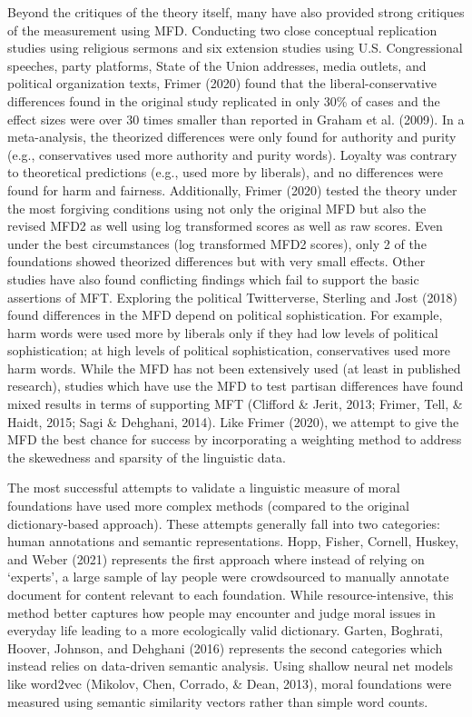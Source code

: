 \documentclass[
  man,floatsintext]{apa6}
\begin{document}
Beyond the critiques of the theory itself, many have also provided strong critiques of the measurement using MFD. Conducting two close conceptual replication studies using religious sermons and six extension studies using U.S. Congressional speeches, party platforms, State of the Union addresses, media outlets, and political organization texts, Frimer (2020) found that the liberal-conservative differences found in the original study replicated in only 30\% of cases and the effect sizes were over 30 times smaller than reported in Graham et al. (2009). In a meta-analysis, the theorized differences were only found for authority and purity (e.g., conservatives used more authority and purity words). Loyalty was contrary to theoretical predictions (e.g., used more by liberals), and no differences were found for harm and fairness. Additionally, Frimer (2020) tested the theory under the most forgiving conditions using not only the original MFD but also the revised MFD2 as well using log transformed scores as well as raw scores. Even under the best circumstances (log transformed MFD2 scores), only 2 of the foundations showed theorized differences but with very small effects. Other studies have also found conflicting findings which fail to support the basic assertions of MFT. Exploring the political Twitterverse, Sterling and Jost (2018) found differences in the MFD depend on political sophistication. For example, harm words were used more by liberals only if they had low levels of political sophistication; at high levels of political sophistication, conservatives used more harm words. While the MFD has not been extensively used (at least in published research), studies which have use the MFD to test partisan differences have found mixed results in terms of supporting MFT (Clifford \& Jerit, 2013; Frimer, Tell, \& Haidt, 2015; Sagi \& Dehghani, 2014). Like Frimer (2020), we attempt to give the MFD the best chance for success by incorporating a weighting method to address the skewedness and sparsity of the linguistic data.

The most successful attempts to validate a linguistic measure of moral foundations have used more complex methods (compared to the original dictionary-based approach). These attempts generally fall into two categories: human annotations and semantic representations. Hopp, Fisher, Cornell, Huskey, and Weber (2021) represents the first approach where instead of relying on `experts', a large sample of lay people were crowdsourced to manually annotate document for content relevant to each foundation. While resource-intensive, this method better captures how people may encounter and judge moral issues in everyday life leading to a more ecologically valid dictionary. Garten, Boghrati, Hoover, Johnson, and Dehghani (2016) represents the second categories which instead relies on data-driven semantic analysis. Using shallow neural net models like word2vec (Mikolov, Chen, Corrado, \& Dean, 2013), moral foundations were measured using semantic similarity vectors rather than simple word counts.
\end{document}
